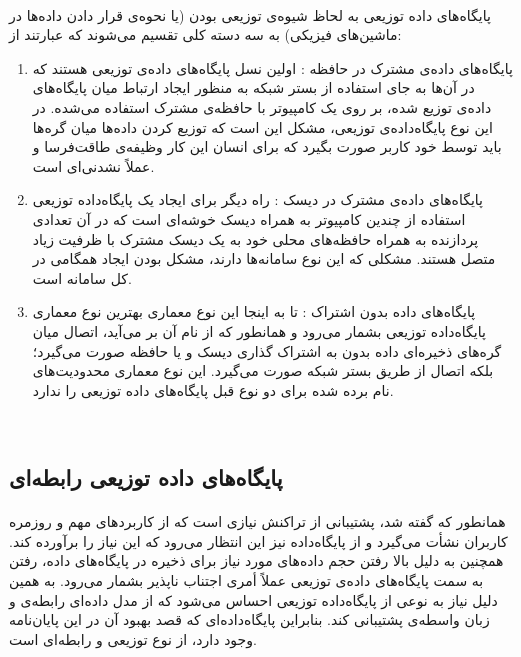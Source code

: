 \paragraph*{}
پایگاه‌های داده توزیعی به لحاظ شیوه‌ی توزیعی بودن (یا نحوه‌ی قرار دادن داده‌ها در ماشین‌های فیزیکی) به سه دسته کلی تقسیم می‌شوند که عبارتند از:
\cite{cattell-2011}

\begin{enumerate}
\item
پایگاه‌های داده‌ی مشترک در حافظه
:
اولین نسل پایگاه‌های داده‌ی توزیعی هستند که در آن‌ها به جای استفاده از بستر شبکه به منظور ایجاد ارتباط میان پایگاه‌های داده‌ی توزیع شده، بر روی یک کامپیوتر با حافظه‌ی مشترک استفاده می‌شده. در این نوع پایگاه‌داده‌ی توزیعی، مشکل این است که توزیع کردن داده‌ها میان گره‌ها باید توسط خود کاربر صورت بگیرد که برای انسان این کار وظیفه‌ی طاقت‌فرسا و عملاً نشدنی‌ای است.
\item
پایگاه‌های داده‌ی مشترک در دیسک
:
راه دیگر برای ایجاد یک پایگاه‌داده توزیعی استفاده از چندین کامپیوتر به همراه دیسک خوشه‌ای
است که در آن تعدادی پردازنده به همراه حافظه‌های محلی خود به یک دیسک مشترک با ظرفیت زیاد متصل هستند. مشکلی که این نوع سامانه‌ها دارند، مشکل بودن ایجاد همگامی در کل سامانه است.
\item
پایگاه‌های داده بدون اشتراک
:
تا به اینجا این نوع معماری بهترین نوع معماری پایگاه‌داده توزیعی بشمار می‌رود و همانطور که از نام آن بر می‌آید، اتصال میان گره‌های ذخیره‌ای داده بدون به اشتراک گذاری دیسک و یا حافظه صورت می‌گیرد؛ بلکه اتصال از طریق بستر شبکه صورت می‌گیرد. این نوع معماری محدودیت‌های نام برده شده برای دو نوع قبل پایگاه‌های داده توزیعی را ندارد.
\end{enumerate}


‌‌\subsection{پایگاه‌های داده توزیعی رابطه‌ای} \label{subsection:relational-distributed-databases}
\paragraph*{}
همانطور که گفته شد، پشتیبانی از تراکنش نیازی است که از کاربردهای مهم و روزمره کاربران نشأت می‌گیرد و از پایگاه‌داده نیز این انتظار می‌رود که این نیاز را برآورده کند. همچنین به دلیل بالا رفتن حجم داده‌های مورد نیاز برای ذخیره در پایگاه‌های داده، رفتن به سمت پایگاه‌های داده‌ی توزیعی عملاً أمری اجتناب ناپذیر بشمار می‌رود. به همین دلیل نیاز به نوعی از پایگاه‌داده توزیعی احساس می‌شود که از مدل داده‌ای رابطه‌ی و زبان واسطه‌ی
پشتیبانی کند. بنابراین پایگاه‌داده‌ای که قصد بهبود آن در این پایان‌نامه وجود دارد، از نوع توزیعی و رابطه‌ای است.

